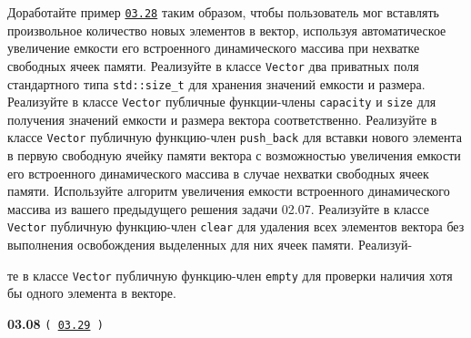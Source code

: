 \documentclass[a4paper,12pt]{article}
\begin{document}
Доработайте пример \href{https://github.com/i-s-m-mipt/Education/blob/master/projects/examples/source/03.28.cpp}{\texttt{03.28}} таким образом, чтобы пользователь мог вставлять произвольное количество новых элементов в вектор, используя автоматическое увеличение емкости его встроенного динамического массива при нехватке свободных ячеек памяти. Реализуйте в классе \lstinline{Vector} два приватных поля стандартного типа \lstinline{std::size_t} для хранения значений емкости и размера. Реализуйте в классе \lstinline{Vector} публичные функции-члены \lstinline{capacity} и \lstinline{size} для получения значений емкости и размера вектора соответственно. Реализуйте в классе \lstinline{Vector} публичную функцию-член \lstinline{push_back} для вставки нового элемента в первую свободную ячейку памяти вектора с возможностью увеличения емкости его встроенного динамического массива в случае нехватки свободных ячеек памяти. Используйте алгоритм увеличения емкости встроенного динамического массива из вашего предыдущего решения задачи 02.07. Реализуйте в классе \lstinline{Vector} публичную функцию-член \lstinline{clear} для удаления всех элементов вектора без выполнения освобождения выделенных для них ячеек памяти. Реализуй- 

те в классе \lstinline{Vector} публичную функцию-член \lstinline{empty} для проверки наличия хотя бы одного элемента в векторе.

\bigskip

{\large \textbf{03.08} \texttt{(\,\href{https://github.com/i-s-m-mipt/Education/blob/master/projects/examples/source/03.29.cpp}{03.29}\,)}}

\bigskip
\end{document}
